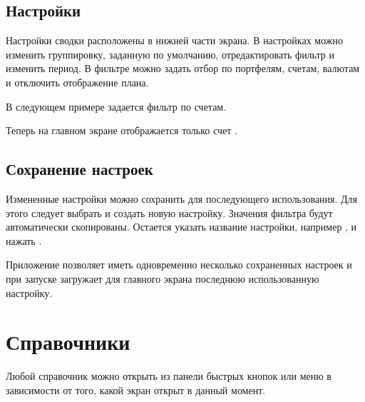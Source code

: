 \documentclass[a4paper,10pt,russian]{sphinxmanual}
\begin{document}
\section{Настройки}
\label{\detokenize{main-screen:id4}}
Настройки сводки расположены в нижней части экрана. В настройках можно изменить группировку, заданную по умолчанию,
отредактировать фильтр и изменить период. В фильтре можно задать отбор по портфелям, счетам, валютам и отключить
отображение плана.

В следующем примере задается фильтр по счетам.

\noindent{}
\noindent{}
\noindent{}
\noindent{}
\noindent{}
\noindent{}

Теперь на главном экране отображается только счет .


\section{Сохранение настроек}
\label{\detokenize{main-screen:id5}}
Измененные настройки можно сохранить для последующего использования. Для этого следует выбрать
 и создать новую настройку. Значения фильтра будут автоматически
скопированы. Остается указать название настройки, например , и
нажать .

\noindent{}
\noindent{}

Приложение позволяет иметь одновременно несколько сохраненных настроек и
при запуске загружает для главного экрана последнюю использованную настройку.


\chapter{Справочники}
\label{\detokenize{directories:chapter-directories}}\label{\detokenize{directories:id1}}\label{\detokenize{directories::doc}}
Любой справочник можно открыть из панели быстрых кнопок или меню  в зависимости от того,
какой экран открыт в данный момент.
\end{document}
